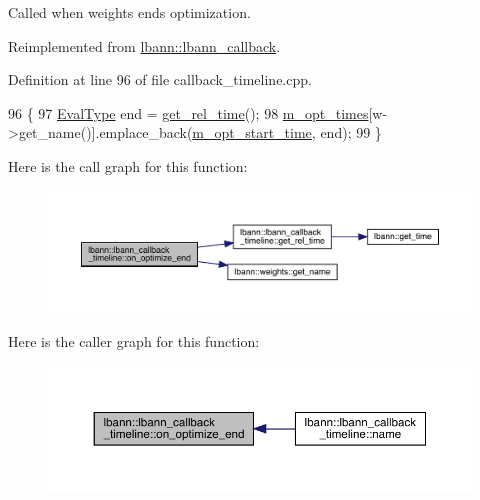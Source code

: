 Called when weights ends optimization. 

Reimplemented from \hyperlink{classlbann_1_1lbann__callback_a4653e2903bfd3903709a81eaf7eabc1a}{lbann\+::lbann\+\_\+callback}.



Definition at line 96 of file callback\+\_\+timeline.\+cpp.


\begin{DoxyCode}
96                                                                   \{
97   \hyperlink{base_8hpp_a3266f5ac18504bbadea983c109566867}{EvalType} end = \hyperlink{classlbann_1_1lbann__callback__timeline_a67da1376356bf2153ab67489014e0ad4}{get\_rel\_time}();
98   \hyperlink{classlbann_1_1lbann__callback__timeline_abc57215e52823fe6f44f040f06f60847}{m\_opt\_times}[w->get\_name()].emplace\_back(\hyperlink{classlbann_1_1lbann__callback__timeline_a9f16bbedce47953a28e63b52d92792c3}{m\_opt\_start\_time}, end);
99 \}
\end{DoxyCode}
Here is the call graph for this function\+:\nopagebreak
\begin{figure}[H]
\begin{center}
\leavevmode
\includegraphics[width=350pt]{classlbann_1_1lbann__callback__timeline_afdf506e2c2d40c7b0d1f845fb0ed077e_cgraph}
\end{center}
\end{figure}
Here is the caller graph for this function\+:\nopagebreak
\begin{figure}[H]
\begin{center}
\leavevmode
\includegraphics[width=350pt]{classlbann_1_1lbann__callback__timeline_afdf506e2c2d40c7b0d1f845fb0ed077e_icgraph}
\end{center}
\end{figure}
\mbox{\label{classlbann_1_1lbann__callback__timeline_a35a431c2545b4087d6f970d45f86c054}} 
